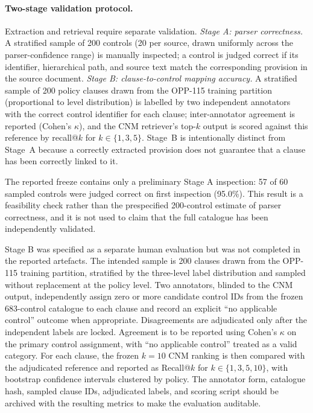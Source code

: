 \documentclass[final,3p,times,twocolumn]{elsarticle}
\begin{document}
	\paragraph{Two-stage validation protocol.}
	Extraction and retrieval require separate validation. \emph{Stage A: parser
	correctness.} A stratified sample of 200 controls (20 per source, drawn uniformly
	across the parser-confidence range) is manually inspected; a control is judged
	correct if its identifier, hierarchical path, and source text match the corresponding
	provision in the source document. \emph{Stage B: clause-to-control mapping accuracy.}
	A stratified sample of 200 policy clauses drawn from the OPP-115 training partition
	(proportional to level distribution) is labelled by two independent annotators
	with the correct control identifier for each clause; inter-annotator agreement
	is reported (Cohen's $\kappa$), and the CNM retriever's top-$k$ output is scored
	against this reference by recall@$k$ for $k \in \{1, 3, 5\}$. Stage~B is intentionally
	distinct from Stage~A because a correctly extracted provision does not guarantee
	that a clause has been correctly linked to it.

	The reported freeze contains only a preliminary Stage A inspection: 57 of 60
	sampled controls were judged correct on first inspection (95.0\%). This result
	is a feasibility check rather than the prespecified 200-control estimate of
	parser correctness, and it is not used to claim that the full catalogue has
	been independently validated.

	Stage B was specified as a separate human evaluation but was not completed in
	the reported artefacts. The intended sample is 200 clauses drawn from the
	OPP-115 training partition, stratified by the three-level label distribution
	and sampled without replacement at the policy level. Two annotators, blinded
	to the CNM output, independently assign zero or more candidate control IDs
	from the frozen 683-control catalogue to each clause and record an explicit
	``no applicable control'' outcome when appropriate. Disagreements are
	adjudicated only after the independent labels are locked. Agreement is to be
	reported using Cohen's $\kappa$ on the primary control assignment, with
	``no applicable control'' treated as a valid category. For each clause, the
	frozen $k=10$ CNM ranking is then compared with the adjudicated reference and
	reported as Recall@$k$ for $k \in \{1,3,5,10\}$, with bootstrap confidence
	intervals clustered by policy. The annotator form, catalogue hash, sampled
	clause IDs, adjudicated labels, and scoring script should be archived with
	the resulting metrics to make the evaluation auditable.
\end{document}
